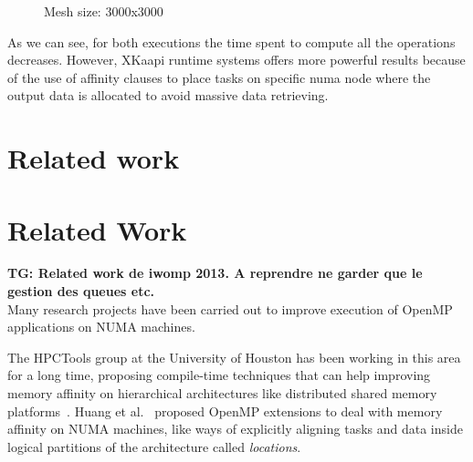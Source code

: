 \documentclass{Styles/llncs}
\newcommand{\TG}[1]{{\color{red}\bfseries TG: #1}}
\begin{document}
\begin{figure}
  \centering
    \caption{Mesh size: 3000x3000}
    \label{figs:spmv:3000}
\end{figure}

As we can see, for both executions the time spent to compute all the operations decreases. However, XKaapi runtime systems offers more powerful results because of the use of affinity clauses to place tasks on specific numa node where the output data is allocated to avoid massive data retrieving.


\section{Related work}

\section{Related Work}
\label{sec:related_work}

\TG{Related work de iwomp 2013. A reprendre ne garder que le gestion des queues etc.}\\

Many research projects have been carried out to improve execution of
OpenMP applications on NUMA machines.

The HPCTools group at the University of Houston has been working in
this area for a long time, proposing compile-time techniques that can
help improving memory affinity on hierarchical architectures like
distributed shared memory
platforms~\cite{Marowka:2004:OAD:1064428.1064431}. Huang et
al.~\cite{Huang-Chapman-locality-OpenMP} proposed OpenMP extensions to
deal with memory affinity on NUMA machines, like ways of explicitly
aligning tasks and data inside logical partitions of the architecture
called \textit{locations}.
\end{document}
